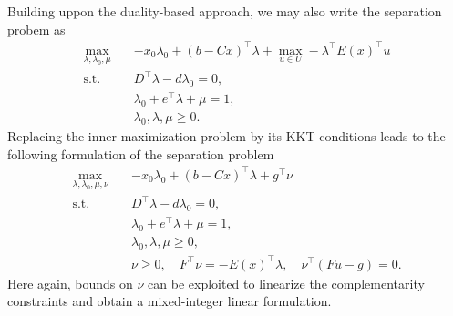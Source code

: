 
Building uppon the duality-based approach, we may also write the separation
probem as 
\begin{align*}
    \max_{\lambda,\lambda_0,\mu} \quad & -x_0\lambda_0 + (b - Cx)^\top \lambda + \max_{u\in U}- \lambda^\top E(x)^\top u \\
    \text{s.t.} \quad & D^\top\lambda - d\lambda_0 = 0, \\
    & \lambda_0 + e^\top\lambda + \mu = 1, \\
    & \lambda_0, \lambda, \mu \ge 0.
\end{align*}
Replacing the inner maximization problem by its KKT conditions leads to the
following formulation of the separation problem
\begin{align*}
    \max_{\lambda,\lambda_0,\mu,\nu} \quad & -x_0\lambda_0 + (b - Cx)^\top \lambda + g^\top\nu \\
    \text{s.t.} \quad & D^\top\lambda - d\lambda_0 = 0, \\
    & \lambda_0 + e^\top\lambda + \mu = 1, \\
    & \lambda_0, \lambda, \mu \ge 0, \\
    & \nu\ge 0, \quad F^\top\nu = -E(x)^\top\lambda, \quad \nu^\top(Fu - g) = 0.
\end{align*}
Here again, bounds on $\nu$ can be exploited to linearize the complementarity
constraints and obtain a mixed-integer linear formulation.


